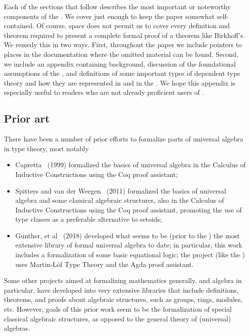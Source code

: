 Each of the sections that follow describes the most important or noteworthy components of the \ualib. We cover just enough to keep the paper somewhat self-contained.  Of course, space does not permit us to cover every definition and theorem required to present a complete formal proof of a theorem like Birkhoff's.  We remedy this in two ways. First, throughout the paper we include pointers to places in the documentation where the omitted material can be found.  Second, we include an appendix containing \agda background, discussion of the foundational assumptions of the \ualib, and definitions of some important types of dependent type theory and how they are represented in \agda and in the \ualib.  We hope this appendix is especially useful to readers who are not already proficient users of \agda.


\subsection*{Prior art}
There have been a number of prior efforts to formalize parts of universal algebra in type theory, most notably
\begin{itemize}
  \item Capretta~\cite{Capretta:1999} (1999) formalized the basics of universal algebra in the Calculus of Inductive Constructions using the Coq proof assistant;
    \item Spitters and van der Weegen~\cite{Spitters:2011} (2011) formalized the basics of universal algebra and some classical algebraic structures, also in the Calculus of Inductive Constructions using the Coq proof assistant, promoting the use of type classes as a preferable alternative to setoids;
 \item Gunther, et al~\cite{Gunther:2018} (2018) developed what seems to be (prior to the \ualib) the most extensive library of formal universal algebra to date; in particular, this work includes a formalization of some basic equational logic; the project (like the \ualib) uses Martin-L\"of Type Theory and the Agda proof assistant.
\end{itemize}
Some other projects aimed at formalizing mathematics generally, and algebra in particular, have developed into very extensive libraries that include definitions, theorems, and proofs about algebraic structures, such as groups, rings, modules, etc.  However, goals of this prior work seem to be the formalization of special classical algebraic structures, as opposed to the general theory of (universal) algebras.

